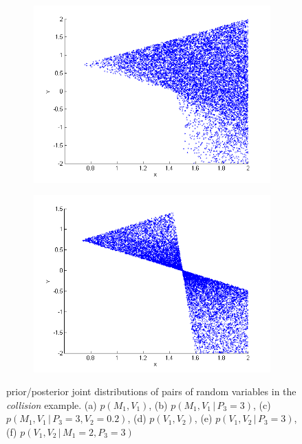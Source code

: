 \documentclass[letterpaper]{article}
\newcommand{\pr}{p}
\newcommand{\nn}{0.16}
\begin{document}
\begin{figure}
\begin{center}
\begin{subfigure}[b]{\nn\textwidth}
                \includegraphics[width=1\textwidth]{Figs/col_v1v2whenPis3.png}
                \caption{}
                \label{fig:mom2}
        \end{subfigure}%
\begin{subfigure}[b]{\nn\textwidth}
                \includegraphics[width=1\textwidth]{Figs/colV1V2givenPis3M1is2.png}
                \caption{}
                \label{fig:mom2}
        \end{subfigure}%
\end{center}
\vspace{-1mm}
\caption{\footnotesize
prior/posterior joint distributions of pairs of random variables in the \emph{collision} example. 
(a) $\pr(M_1, V_1)$,
(b) $\pr(M_1, V_1 \, | \, P_3 = 3)$,
(c) $\pr(M_1, V_1 \, | \, P_3 = 3, V_2 = 0.2)$,
(d) $\pr(V_1, V_2)$,
(e) $\pr(V_1, V_2 \, | \, P_3 = 3)$,
(f) $\pr(V_1, V_2 \, | \, M_1 =2, P_3 = 3)$
} 
\label{fig:mom}
\end{figure}
\end{document}

